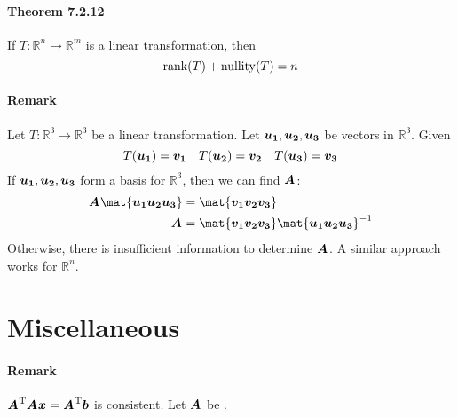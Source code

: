\documentclass[a4paper]{article}
\newcommand{\R}{\mathbb{R}}
\newcommand{\inv}{^{-1}}
\begin{document}
\begin{multicols*}{3}
    \paragraph{Theorem 7.2.12} If $T: \R^n \rightarrow \R^m$ is a linear transformation, then
      \begin{equation*}
        \matrank{T} + \matnullity{T} = n
      \end{equation*}
      \paragraph{Remark} Let $T: \R^3 \rightarrow \R^3$ be a linear transformation. Let $\u[1],\u[2],\u[3]$ be vectors in $\R^3$. Given
        \begin{equation*}
          T(\u[1]) = \v[1] \quad T(\u[2]) = \v[2] \quad T(\u[3]) = \v[3]
        \end{equation*}
        If $\u[1], \u[2], \u[3]$ form a basis for $\R^3$, then we can find $\A$:
        \begin{align*}
          \A\mat{\u[1] \u[2] \u[3]} &= \mat{\v[1] \v[2] \v[3]} \\
          \A &= \mat{\v[1] \v[2] \v[3]} \mat{\u[1] \u[2] \u[3]}\inv
        \end{align*}
        Otherwise, there is insufficient information to determine $\A$. A similar approach works for $\R^n$.
  \section*{Miscellaneous}
    \paragraph{Remark} $\A\tr\A\x = \A\tr\b$ is consistent. Let $\A$ be .

\end{multicols*}
\end{document}
